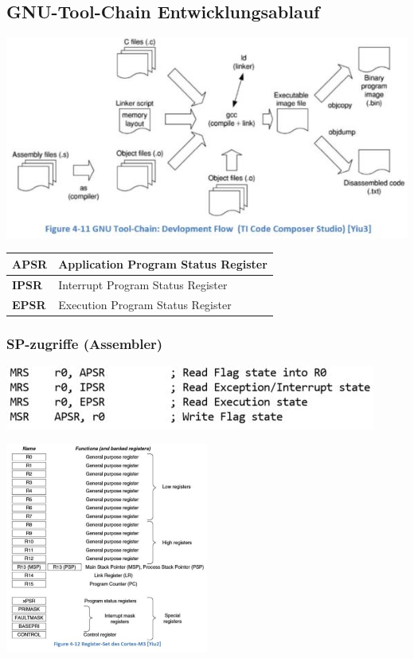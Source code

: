 \subsection{GNU-Tool-Chain Entwicklungsablauf}
\begin{multicols}{2}
    \begin{minipage}{\linewidth}
        \includegraphics[width=\textwidth]{images/gnutoolchain}
        \begin{tabular}{|l|l|}
            \hline 
            \textbf{APSR}& Application Program Status Register \\ 
            \hline 
            \textbf{IPSR}& Interrupt Program Status Register \\ 
            \hline 
            \textbf{EPSR}& Execution Program Status Register \\ 
            \hline 
            \end{tabular}
        \subsubsection{SP-zugriffe (Assembler)}
        \includegraphics[width=\textwidth]{images/SPzugriffe}   
    \end{minipage}
    
    \includegraphics[width=0.5\textwidth]{images/gnutoolchain1}
\end{multicols}

